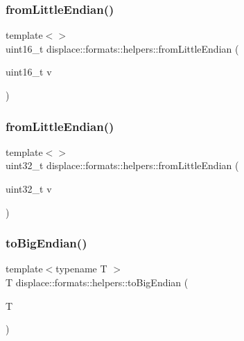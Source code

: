\subsubsection{\texorpdfstring{fromLittleEndian()}{fromLittleEndian()}\hspace{0.1cm}{\footnotesize\ttfamily [1/2]}}
{\footnotesize\ttfamily template$<$$>$ \\
uint16\+\_\+t displace\+::formats\+::helpers\+::from\+Little\+Endian (\begin{DoxyParamCaption}\item[{uint16\+\_\+t}]{v }\end{DoxyParamCaption})\hspace{0.3cm}{\ttfamily [inline]}}

\mbox{\label{namespacedisplace_1_1formats_1_1helpers_a71d661eccec2286c4bacb3770486a269}} 
\subsubsection{\texorpdfstring{fromLittleEndian()}{fromLittleEndian()}\hspace{0.1cm}{\footnotesize\ttfamily [2/2]}}
{\footnotesize\ttfamily template$<$$>$ \\
uint32\+\_\+t displace\+::formats\+::helpers\+::from\+Little\+Endian (\begin{DoxyParamCaption}\item[{uint32\+\_\+t}]{v }\end{DoxyParamCaption})\hspace{0.3cm}{\ttfamily [inline]}}

\mbox{\label{namespacedisplace_1_1formats_1_1helpers_aa87d7f7cd11f2a4890d28828fe5e0def}} 
\subsubsection{\texorpdfstring{toBigEndian()}{toBigEndian()}\hspace{0.1cm}{\footnotesize\ttfamily [1/2]}}
{\footnotesize\ttfamily template$<$typename T $>$ \\
T displace\+::formats\+::helpers\+::to\+Big\+Endian (\begin{DoxyParamCaption}\item[{T}]{ }\end{DoxyParamCaption})\hspace{0.3cm}{\ttfamily [inline]}}


